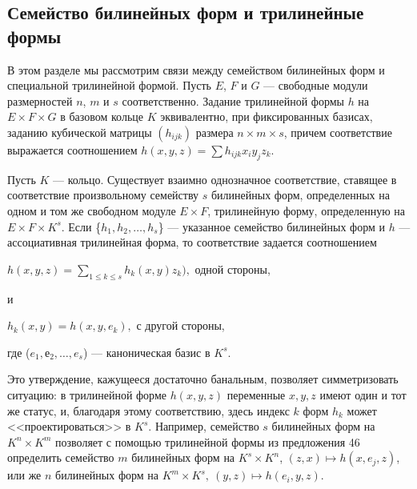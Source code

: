 \documentclass{mai_book}
\renewcommand{\le}{\leqslant}
\begin{document}
\subsection{Семейство билинейных форм и трилинейные формы}
В этом разделе мы рассмотрим связи между семейством билинейных форм и специальной трилинейной формой. Пусть $E$, $F$ и $G$ --- свободные модули размерностей $n$, $m$ и $s$ соответственно. Задание трилинейной формы $h$ на $E \times F \times G$ в базовом кольце $K$ эквивалентно, при фиксированных базисах, заданию кубической матрицы $(h_{ijk})$ размера $n \times m \times s$, причем соответствие выражается соотношением $h(x,y,z)= \sum h_{ijk}x_iy_jz_k$.
\begin{predl}
  Пусть $K$ — кольцо. Существует взаимно однозначное соответствие, ставящее в соответствие произвольному семейству $s$ билинейных форм, определенных на одном и том же свободном модуле $E \times F$, трилинейную форму, определенную на $E \times F \times K^s$. Если \{$h_1,h_2,\ldots,h_s$\} --- указанное семейство билинейных форм и $h$ --- ассоциативная трилинейная форма, то соответствие задается соотношением
  \begin{center}
    $h(x,y,z)= \sum_{1 \le k \le s}h_k(x,y)z_k),$ одной стороны,\par
    и\par
    $h_k(x,y)=h(x,y,e_k),$ с другой стороны,
  \end{center}
  \noindent
  где ($e_1,е_2,\ldots,e_s$) --- каноническая базис в $K^s$.
\end{predl}
Это утверждение, кажущееся достаточно банальным, позволяет симметризовать ситуацию: в трилинейной форме $h(x,y,z)$ переменные $x,y,z$ имеют один и тот же статус, и, благодаря этому соответствию, здесь индекс $k$ форм $h_k$ может <<проектироваться>> в $K^s$. Например, семейство $s$ билинейных форм на $K^n \times K^m$ позволяет с помощью трилинейной формы из предложения 46 определить семейство $m$ билинейных форм на $K^s \times K^n$, $(z,x) \mapsto h(x,e_j,z)$, или же $n$ билинейных форм на $K^m \times K^s,\ (y,z) \mapsto h(e_i,y,z)$.
\end{document}
